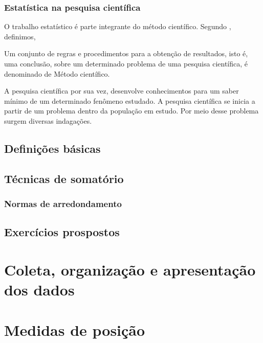 \documentclass[
]{book}
\begin{document}
\hypertarget{subsec:est-pesqcient}{%
\subsection{Estatística na pesquisa científica}\label{subsec:est-pesqcient}}

O trabalho estatístico é parte integrante do método científico. Segundo \citet{silva2005}, definimos,

\leavevmode\hypertarget{def:prob}{}%
Um conjunto de regras e procedimentos para a obtenção de resultados, isto é, uma conclusão, sobre um determinado problema de uma pesquisa científica, é denominado de Método científico.

A pesquisa científica por sua vez, desenvolve conhecimentos para um saber mínimo de um determinado fenômeno estudado. A pesquisa científica se inicia a partir de um problema dentro da população em estudo. Por meio desse problema surgem diversas indagações.

\hypertarget{definiuxe7uxf5es-buxe1sicas}{%
\section{Definições básicas}\label{definiuxe7uxf5es-buxe1sicas}}

\hypertarget{tuxe9cnicas-de-somatuxf3rio}{%
\section{Técnicas de somatório}\label{tuxe9cnicas-de-somatuxf3rio}}

\hypertarget{normas-de-arredondamento}{%
\subsection{Normas de arredondamento}\label{normas-de-arredondamento}}

\hypertarget{exercuxedcios-prospostos}{%
\section*{Exercícios prospostos}\label{exercuxedcios-prospostos}}


\hypertarget{chap:coad}{%
\chapter{Coleta, organização e apresentação dos dados}\label{chap:coad}}

\hypertarget{chap:mp}{%
\chapter{Medidas de posição}\label{chap:mp}}
\end{document}
